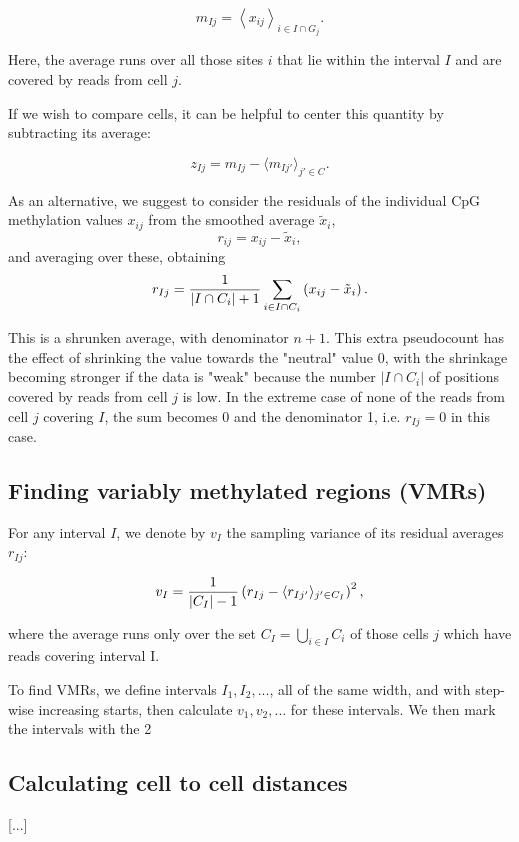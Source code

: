 \documentclass[twocolumn,10pt]{article}
\begin{document}
$$ m_{Ij} = \left< x_{ij} \right>_{i\in I\cap G_j}.$$

Here, the average runs over all those sites $i$ that lie within the interval $I$ and are covered by reads from cell $j$.

If we wish to compare cells, it can be helpful to center this quantity by subtracting its average:

$$ z_{Ij} = m_{Ij} - \langle m_{Ij'}\rangle_{j'\in C}.$$

As an alternative, we suggest to consider the residuals of the individual CpG methylation values $x_{ij}$ from the smoothed average $\tilde x_i$,
$$ r_{ij} = x_{ij} - \tilde x_i, $$
and averaging over these, obtaining
$$ r_{Ij} = \frac{\scriptsize{1}}{\scriptsize{|I\cap C_i|+1}}\sum_{i\in I\cap C_i}\left( x_{ij} - \tilde x_i \right).$$

This is a shrunken average, with denominator $n+1$. This extra pseudocount has the effect of shrinking the value towards the "neutral" value 0, with the shrinkage becoming stronger if the data is "weak" because the number $|I\cap C_i|$ of positions covered by reads from cell $j$  is low. In the extreme case of none of the reads from cell $j$ covering $I$, the sum becomes 0 and the denominator 1, i.e. $r_{Ij}=0$ in this case.

\subsection{Finding variably methylated regions (VMRs)}

For any interval $I$, we denote by $v_I$ the sampling variance of its residual averages $r_{Ij}$:

$$ v_I = \frac{\scriptsize{1}}{\scriptsize{|C_I|-1}}\left( r_{Ij} - \langle r_{Ij'}\rangle_{j'\in C_I} \right)^2,$$

where the average runs only over the set $C_I=\bigcup_{i\in I}C_i$ of those cells $j$ which have reads covering interval I.

To find VMRs, we define intervals $I_1, I_2, ...$, all of the same width, and with step-wise increasing starts, then calculate $v_1, v_2, ...$ for these intervals. We then mark the intervals with the 2%

\subsection{Calculating cell to cell distances}

[...]



\end{document}
